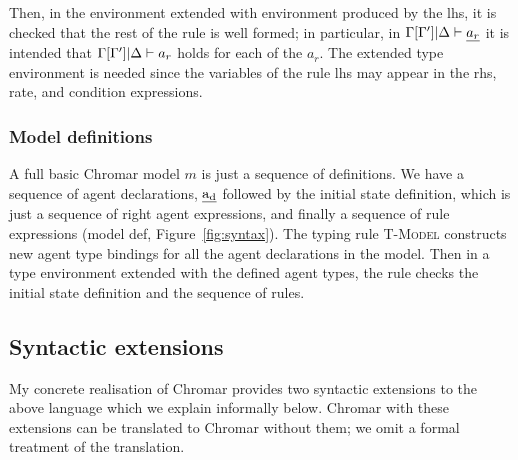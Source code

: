  
 Then, in the environment extended with environment produced by the lhs,  it is checked that the rest of the rule is well formed; in particular, in $ \Gamma[\Gamma']|\Delta \vdash \underline{a_r} $ it is intended that $ \Gamma[\Gamma']|\Delta \vdash a_r $ holds  for each of the $a_r$.   The extended type environment is needed since the variables of the rule lhs may appear in the rhs, rate, and condition expressions.

\subsubsection*{Model definitions}
A full basic Chromar model $m$ is just a sequence of definitions. We have a sequence of agent declarations, $\underline{\mathrm{a_d}}$ followed by the initial state definition, which is just a sequence of right agent expressions, and finally a sequence of rule expressions (\textsf{model def}, Figure~\ref{fig:syntax}). The typing rule \textsc{T-Model} constructs new agent type bindings for all the agent declarations in the model. 
%
Then in a type environment extended with the defined agent types, the rule checks the initial state definition and the sequence of rules.

\subsection{Syntactic extensions}

My concrete realisation of Chromar provides two syntactic extensions to the above language which we explain informally below. Chromar with these extensions can be translated to Chromar without them; we omit a formal treatment of the translation.


